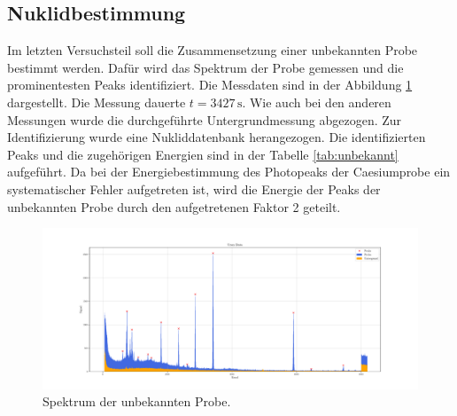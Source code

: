 \subsection{Nuklidbestimmung} \label{sec:nuklid}
Im letzten Versuchsteil soll die Zusammensetzung einer unbekannten Probe bestimmt werden.
Dafür wird das Spektrum der Probe gemessen und die prominentesten Peaks identifiziert.
Die Messdaten sind in der Abbildung \ref{fig:unbekannt} dargestellt.
Die Messung dauerte $t = 3427 \, \si{\second}$.
Wie auch bei den anderen Messungen wurde die durchgeführte Untergrundmessung abgezogen.
Zur Identifizierung wurde eine Nukliddatenbank \cite{Lara} herangezogen.
Die identifizierten Peaks und die zugehörigen Energien sind in der Tabelle \ref{tab:unbekannt} aufgeführt.
Da bei der Energiebestimmung des Photopeaks der Caesiumprobe ein systematischer Fehler aufgetreten ist, wird die Energie der Peaks der unbekannten Probe durch den aufgetretenen Faktor 2 geteilt.
\begin{figure}[H]
  \centering
  \includegraphics[width=\textwidth]{../plots/Uran.pdf}
  \caption{Spektrum der unbekannten Probe.}
  \label{fig:unbekannt}
\end{figure}

